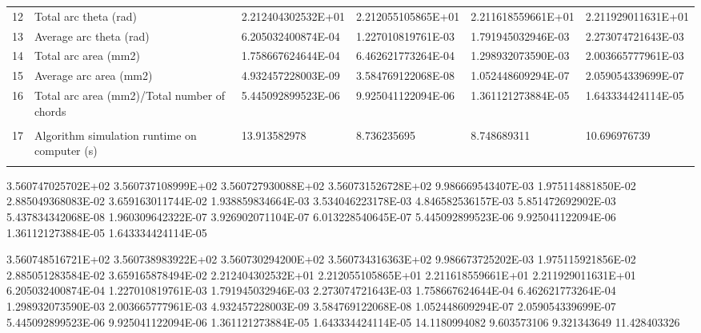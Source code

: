 \begin{tabular}{ p{0.5cm} p{8.0cm} p{4.00cm} p{4.0cm} p{4.00cm} p{4.0cm}}
12	& Total arc theta (rad)	                               & 2.212404302532E+01	& 2.212055105865E+01   & 2.211618559661E+01	& 2.211929011631E+01 \\
13	& Average arc theta (rad)	                           & 6.205032400874E-04	& 1.227010819761E-03   & 1.791945032946E-03	& 2.273074721643E-03 \\
14	& Total arc area (mm2)	                               & 1.758667624644E-04	& 6.462621773264E-04   & 1.298932073590E-03	& 2.003665777961E-03 \\
15	& Average arc area (mm2)	                           & 4.932457228003E-09	& 3.584769122068E-08   & 1.052448609294E-07	& 2.059054339699E-07 \\
16	& Total arc area (mm2)/Total number of chords	       & 5.445092899523E-06	& 9.925041122094E-06   & 1.361121273884E-05	& 1.643334424114E-05 \\
	&                                                      &                    &                      &                    & \\
17	& Algorithm simulation runtime on computer (s)         & 13.913582978	    & 8.736235695	       & 8.748689311	    & 10.696976739 \\
	&                                                      &                    &                      &                    & 
\end{tabular}



3.560747025702E+02	3.560737108999E+02	3.560727930088E+02	3.560731526728E+02
9.986669543407E-03	1.975114881850E-02	2.885049368083E-02	3.659163011744E-02
1.938859834664E-03	3.534046223178E-03	4.846582536157E-03	5.851472692902E-03
5.437834342068E-08	1.960309642322E-07	3.926902071104E-07	6.013228540645E-07
5.445092899523E-06	9.925041122094E-06	1.361121273884E-05	1.643334424114E-05

3.560748516721E+02	3.560738983922E+02	3.560730294200E+02	3.560734316363E+02
9.986673725202E-03	1.975115921856E-02	2.885051283584E-02	3.659165878494E-02
2.212404302532E+01	2.212055105865E+01	2.211618559661E+01	2.211929011631E+01
6.205032400874E-04	1.227010819761E-03	1.791945032946E-03	2.273074721643E-03
1.758667624644E-04	6.462621773264E-04	1.298932073590E-03	2.003665777961E-03
4.932457228003E-09	3.584769122068E-08	1.052448609294E-07	2.059054339699E-07
5.445092899523E-06	9.925041122094E-06	1.361121273884E-05	1.643334424114E-05
14.1180994082	9.603573106	9.321343649	11.428403326

